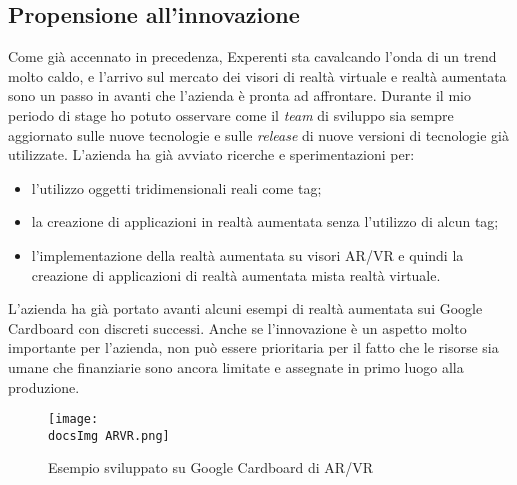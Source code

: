 \subsection{Propensione all'innovazione}
Come gi\`a accennato in precedenza, Experenti sta cavalcando l'onda di un trend molto caldo, e l'arrivo sul mercato dei visori di realt\`a virtuale e realt\`a aumentata sono un passo in avanti che l'azienda \`e pronta ad affrontare. Durante il mio periodo di stage ho potuto osservare come il \textit{team} di sviluppo sia sempre aggiornato sulle nuove tecnologie e sulle \textit{release} di nuove versioni di tecnologie gi\`a utilizzate.
L'azienda ha gi\`a avviato ricerche e sperimentazioni per:
\begin{itemize}
	\item l'utilizzo oggetti tridimensionali reali come tag;
	\item la creazione di applicazioni in realt\`a aumentata senza l'utilizzo di alcun tag;
	\item l'implementazione della realt\`a aumentata su visori AR/VR e quindi la creazione di applicazioni di realt\`a aumentata mista realt\`a virtuale.
\end{itemize}
L'azienda ha gi\`a portato avanti alcuni esempi di realt\`a aumentata sui Google Cardboard con discreti successi.
Anche se l'innovazione \`e un aspetto molto importante per l'azienda, non pu\`o essere prioritaria per il fatto che le risorse sia umane che finanziarie sono ancora limitate e assegnate in primo luogo alla produzione.

\begin{figure}[H]
	\centering
	\texttt{[image: \\docsImg ARVR.png]}
	\caption{Esempio sviluppato su Google Cardboard di AR/VR}
	\label{fig:Esempio sviluppato su Google Cardboard di AR/VR}
\end{figure}